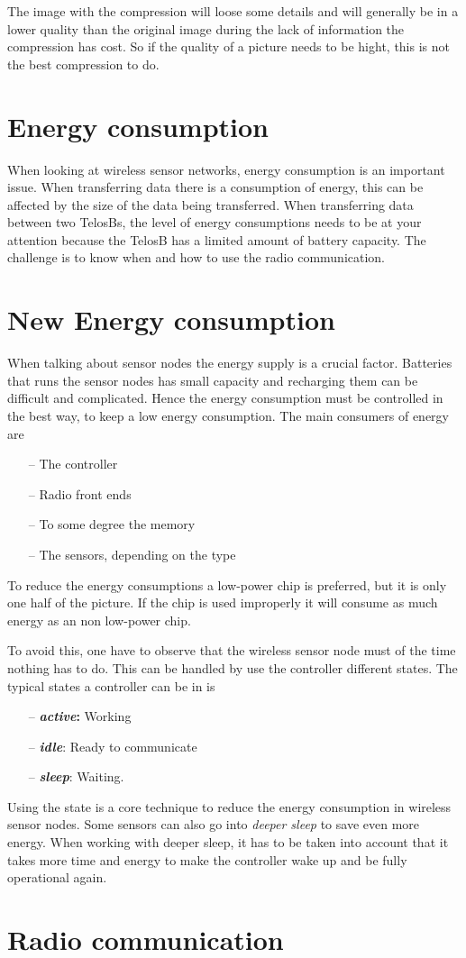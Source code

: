 The image with the compression will loose some details and will generally be in a lower quality than the original image during the lack of information the compression has cost. So if the quality of a picture needs to be hight, this is not the best compression to do.  

\section{Energy consumption}
When looking at wireless sensor networks, energy consumption is an important issue. When transferring data there is a consumption of energy, this can be affected by the size of the data being transferred. When transferring data between two TelosBs, the level of energy consumptions needs to be at your attention because the TelosB has a limited amount of battery capacity. The challenge is to know when and how to use the radio communication.

\section{New Energy consumption}
When talking about sensor nodes the energy supply is a crucial factor. Batteries that runs the sensor nodes has small capacity and recharging them can be difficult and complicated. Hence the energy consumption must be controlled in the best way, to keep a low energy consumption.
The main consumers of energy are
\begin{itemize}
	\item[--] The controller
	\item[--] Radio front ends
	\item[--] To some degree the memory
	\item[--] The sensors, depending on the type
\end{itemize}
	 
To reduce the energy consumptions a low-power chip is preferred, but it is only one half of the picture. If the chip is used improperly it will consume as much energy as an non low-power chip.

To avoid this, one have to observe that the wireless sensor node must of the time nothing has to do. This can be handled by use the controller different states. The typical states a controller can be in is
\begin{itemize}
	\item[--] \textbf{\emph{active}:} Working 
	\item[--] \textbf{\emph{idle}}: Ready to communicate 
	\item[--] \textbf{\emph{sleep}}: Waiting.
\end{itemize}
Using the state is  a core technique to reduce the energy consumption in wireless sensor nodes. Some sensors can also go into \emph{deeper sleep} to save even more energy. When working with deeper sleep, it has to be taken into account that it takes more time and energy to make the controller wake up and be fully operational again. 

 
\section{Radio communication}
